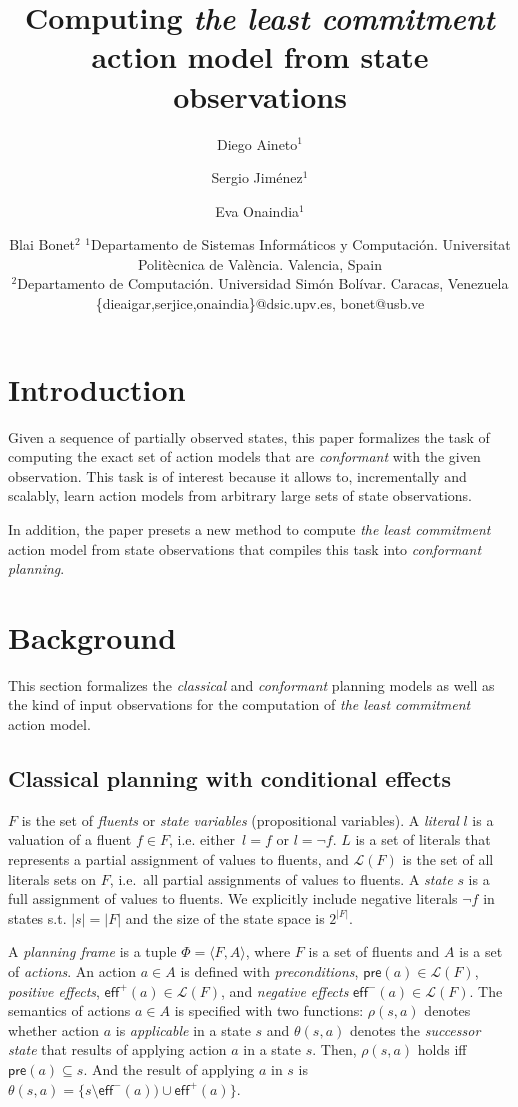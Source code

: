 \documentclass{article}
\title{Computing {\em the least commitment} action model from state observations}
\author{
Diego Aineto$^1$\and
Sergio Jim\'enez$^1$\and
Eva Onaindia$^1$\And
\and
Blai Bonet$^2$
\affiliations
$^1${\small Departamento de Sistemas Inform\'aticos y Computaci\'on. Universitat Polit\`ecnica de Val\`encia. Valencia, Spain}\\
$^2${\small Departamento de Computaci\'on. Universidad Sim\'on Bolívar. Caracas, Venezuela}
\emails
{\scriptsize \{dieaigar,serjice,onaindia\}@dsic.upv.es, bonet@usb.ve}}
\newcommand{\tup}[1]{{\langle #1 \rangle}}
\newcommand{\pre}{\mathsf{pre}}     %
\newcommand{\eff}{\mathsf{eff}}     %
\begin{document}
\maketitle

\begin{abstract}
  
\end{abstract}

\section{Introduction}
Given a sequence of partially observed states, this paper formalizes the task of computing the exact set of action models that are {\em conformant} with the given observation. This task is of interest because it allows to, incrementally and scalably, learn action models from arbitrary large sets of state observations.

In addition, the paper presets a new method to compute {\em the least commitment} action model from state observations that compiles this task into {\em conformant planning}.



\section{Background}
This section formalizes the {\em classical} and {\em conformant} planning models as well as the kind of input observations for the computation of {\em the least commitment} action model.

\subsection{Classical planning with conditional effects}
$F$ is the set of {\em fluents} or {\em state variables} (propositional variables). A {\em literal} $l$ is a valuation of a fluent $f\in F$, i.e. either~$l=f$ or $l=\neg f$. $L$ is a set of literals that represents a partial assignment of values to fluents, and $\mathcal{L}(F)$ is the set of all literals sets on $F$, i.e.~all partial assignments of values to fluents. A {\em state} $s$ is a full assignment of values to fluents. We explicitly include negative literals $\neg f$ in states s.t. $|s|=|F|$ and the size of the state space is $2^{|F|}$.

A {\em planning frame} is a tuple $\Phi=\tup{F,A}$, where $F$ is a set of fluents and $A$ is a set of \emph{actions}. An action $a\in A$ is defined with {\em preconditions}, $\pre(a)\in\mathcal{L}(F)$, {\em positive effects}, $\eff^+(a)\in\mathcal{L}(F)$, and {\em negative effects} $\eff^-(a)\in\mathcal{L}(F)$. The semantics of actions $a\in A$ is specified with two functions: $\rho(s,a)$ denotes whether action $a$ is {\em applicable} in a state $s$ and $\theta(s,a)$ denotes the {\em successor state} that results of applying action $a$ in a state $s$. Then, $\rho(s,a)$ holds iff $\pre(a)\subseteq s$. And the result of applying $a$ in $s$ is $\theta(s,a)=\{s\setminus\eff^-(a))\cup\eff^+(a)\}$.
\end{document}

